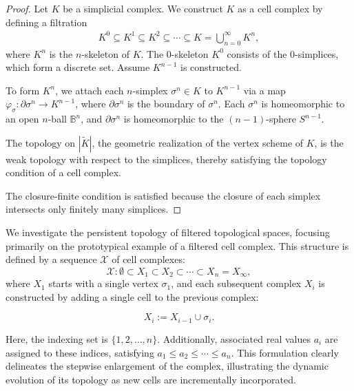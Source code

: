 \begin{proof}
Let \(K\) be a simplicial complex. We construct \(K\) as a cell complex by defining a filtration
\begin{align}
K^0 \subseteq K^1 \subseteq K^2 \subseteq \cdots \subseteq K = \bigcup_{n=0}^{\infty} K^n,
\end{align}
where \(K^n\) is the \(n\)-skeleton of \(K\). The 0-skeleton \(K^0\) consists of the 0-simplices, which form a discrete set. Assume \(K^{n-1}\) is constructed.

To form \(K^n\), we attach each \(n\)-simplex \(\sigma^n \in K\) to \(K^{n-1}\) via a map \(\varphi_\sigma : \partial \sigma^n \to K^{n-1}\), where \(\partial \sigma^n\) is the boundary of \(\sigma^n\). Each \(\sigma^n\) is homeomorphic to an open \(n\)-ball \(\mathbb{B}^n\), and \(\partial \sigma^n\) is homeomorphic to the \((n-1)\)-sphere \(S^{n-1}\).

The topology on \(|\tilde{K}|\), the geometric realization of the vertex scheme of \(K\), is the weak topology with respect to the simplices, thereby satisfying the topology condition of a cell complex.

The closure-finite condition is satisfied because the closure of each simplex intersects only finitely many simplices.
\end{proof}

We investigate the persistent topology of filtered topological spaces, focusing primarily on the prototypical example of a filtered cell complex. This structure is defined by a sequence \(\mathcal{X}\) of cell complexes:
\begin{equation}
	\mathcal{X}: \emptyset \subset X_{1} \subset X_{2} \subset \cdots \subset X_{n} = X_{\infty},
\end{equation}
where \(X_{1}\) starts with a single vertex \(\sigma_{1}\), and each subsequent complex \(X_{i}\) is constructed by adding a single cell to the previous complex:

\begin{equation}
	X_{i} := X_{i-1} \cup \sigma_{i}.
\end{equation}

Here, the indexing set is \(\{1, 2, \ldots, n\}\). Additionally, associated real values \(a_{i}\) are assigned to these indices, satisfying \(a_{1} \leq a_{2} \leq \cdots \leq a_{n}\). This formulation clearly delineates the stepwise enlargement of the complex, illustrating the dynamic evolution of its topology as new cells are incrementally incorporated.

